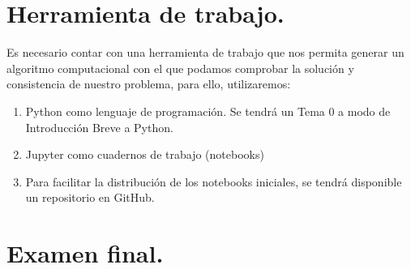 \section{Herramienta de trabajo.}

Es necesario contar con una herramienta de trabajo que nos permita generar un algoritmo computacional con el que podamos comprobar la solución y consistencia de nuestro problema, para ello, utilizaremos:
\begin{enumerate}[label=\roman*)]
\item Python como lenguaje de programación. Se tendrá un Tema 0 a modo de Introducción Breve a Python.
\item Jupyter como cuadernos de trabajo (notebooks)
\item Para facilitar la distribución de los notebooks iniciales, se tendrá disponible un repositorio en GitHub.
\end{enumerate}

\section{Examen final.}


